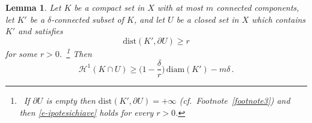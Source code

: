 \documentclass[11pt,reqno,a4paper,final]{amsart}
\numberwithin{equation}{section}
\theoremstyle{mytheorem}
\newtheorem{lemma}[subsection]{Lemma}
\theoremstyle{myremark}
\theoremstyle{myparagraph}
\newcommand{\footnoteb}[1]{\footnote{~#1}}
\newcommand{\Haus}{\mathscr{H}}
\newcommand{\bd}{\partial}
\newcommand{\diam}{\mathrm{diam}}
\newcommand{\dist}{\mathrm{dist}}
\begin{document}
\begin{lemma}
\label{s-lemmachiave1}
Let $K$ be a compact set in $X$ with at most $m$ connected components, 
let $K'$ be a $\delta$-connected subset of $K$, 
and let $U$ be a closed set in $X$ which contains $K'$ 
and satisfies
%
\begin{equation}
\label{e-ipotesichiave}
\dist(K',\bd U) \ge r
\end{equation}
%
for some $r>0$.%
%
\,\footnoteb{If $\bd U$ is empty then $\dist(K',\bd U)=+\infty$ (cf.~Footnote~\ref{footnote3}) 
and then \eqref{e-ipotesichiave} holds for every $r>0$.}
%
Then 
%
\begin{equation}
\label{e-stimachiave}
\Haus^1(K\cap U) \ge \Big( 1 - \frac{\delta}{r} \Big) \, \diam(K') - m\delta
\, .
\end{equation}
%
\end{lemma}
\end{document}
